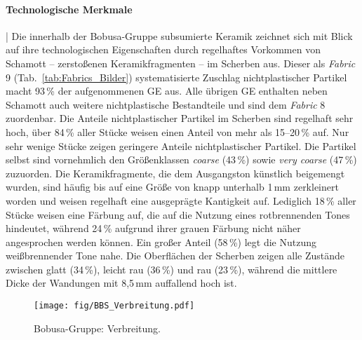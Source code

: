 \paragraph{Technologische Merkmale}\hspace{-.5em}|\hspace{.5em}%
Die innerhalb der Bobusa-Gruppe subsumierte Keramik zeichnet sich mit Blick auf ihre technologischen Eigenschaften durch regelhaftes Vorkommen von Schamott -- zerstoßenen Keramikfragmenten -- im Scherben aus. Dieser als \textit{Fabric} 9 (Tab.~\ref{tab:Fabrics_Bilder}) systematisierte Zuschlag nichtplastischer Partikel macht 93\,\% der aufgenommenen GE aus. Alle übrigen GE enthalten neben Schamott auch weitere nichtplastische Bestandteile und sind dem \textit{Fabric} 8 zuordenbar. Die Anteile nichtplastischer Partikel im Scherben sind regelhaft sehr hoch, über 84\,\% aller Stücke weisen einen Anteil von mehr als 15--20\,\% auf. Nur sehr wenige Stücke zeigen geringere Anteile nichtplastischer Partikel. Die Partikel selbst sind vornehmlich den Größenklassen \textit{coarse} (43\,\%) sowie \textit{very coarse} (47\,\%) zuzuorden. Die Keramikfragmente, die dem Ausgangston künstlich beigemengt wurden, sind häufig bis auf eine Größe von knapp unterhalb 1\,mm zerkleinert worden und weisen regelhaft eine ausgeprägte Kantigkeit auf. Lediglich 18\,\% aller Stücke weisen eine Färbung auf, die auf die Nutzung eines rotbrennenden Tones hindeutet, während 24\,\% aufgrund ihrer grauen Färbung nicht näher angesprochen werden können. Ein großer Anteil (58\,\%) legt die Nutzung weißbrennender Tone nahe. Die Oberflächen der Scherben zeigen alle Zustände zwischen glatt (34\,\%), leicht rau (36\,\%) und rau (23\,\%), während die mittlere Dicke der Wandungen mit 8,5\,mm auffallend hoch ist.

\begin{figure*}[p]
	\centering
	\texttt{[image: fig/BBS\_Verbreitung.pdf]}
	\caption{Bobusa-Gruppe: Verbreitung.}
	\label{fig:BBS_Verbreitung}
\end{figure*}


